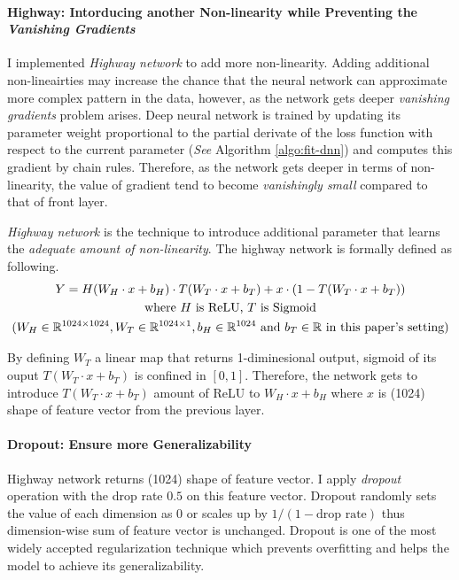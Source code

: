 \documentclass[12pt,letterpaper]{article}
\begin{document}
\paragraph{Highway: Intorducing another Non-linearity while Preventing the \textit{Vanishing Gradients}}
I implemented \textit{Highway network} \citep{highway} to add more non-linearity. Adding additional non-lineairties may increase the chance that the neural network can approximate more complex pattern in the data, however, as the network gets deeper \textit{vanishing gradients} problem arises.
Deep neural network is trained by updating its parameter weight proportional to the partial derivate of the loss function with respect to the current parameter (\textit{See} Algorithm \ref{algo:fit-dnn}) and computes this gradient by chain rules. Therefore, as the network gets deeper in terms of non-linearity, the value of gradient tend to become \textit{vanishingly small} compared to that of front layer.

\textit{Highway network} is the technique to introduce additional parameter that learns the \textit{adequate amount of non-linearity}. The highway network is formally defined as following.
\begin{gather}
  \nonumber Y = H(W_H \cdot x + b_H) \cdot T(W_T \cdot x + b_T) + x \cdot (1-T(W_T \cdot x + b_T)) \\
  \nonumber \text{where } H \text{ is ReLU, }  T \text{ is Sigmoid}\\
  \nonumber (W_H \in \Bbb R^{1024 \times 1024}, W_T \in \Bbb R^{1024 \times 1}, b_H \in \Bbb R^{1024} \text{ and } b_T \in \Bbb R \text{ in this paper's setting})
\end{gather}

\noindent By defining $W_T$ a linear map that returns 1-diminesional output, sigmoid of its ouput $T(W_T \cdot x + b_T)$ is confined in $[0, 1]$. Therefore, the network gets to introduce $T(W_T \cdot x + b_T)$ amount of ReLU to $W_H \cdot x + b_H$ where $x$ is (1024) shape of feature vector from the previous layer.

\paragraph{Dropout: Ensure more Generalizability}

Highway network returns (1024) shape of feature vector. I apply \textit{dropout} operation \citep{dropout} with the drop rate $0.5$ on this feature vector. Dropout randomly sets the value of each dimension as $0$ or scales up by $1/(1-\text{drop rate})$ thus dimension-wise sum of feature vector is unchanged.
Dropout is one of the most widely accepted regularization technique which prevents overfitting and helps the model to achieve its generalizability.
\end{document}
